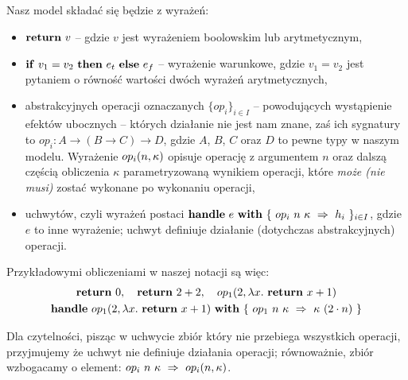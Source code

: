 Nasz model składać się będzie z wyrażeń:
\begin{itemize}
\item \(\mathbf{return}\ v\) -- gdzie \(v\) jest wyrażeniem boolowskim lub arytmetycznym,
\item \(\mathbf{if}\ v_1 = v_2\ \mathbf{then}\ e_t\ \mathbf{else}\ e_f\) -- wyrażenie warunkowe, gdzie \(v_1 = v_2\) jest pytaniem o równość wartości dwóch wyrażeń arytmetycznych,
\item abstrakcyjnych operacji oznaczanych \(\{op_i\}_{i \in I}\) -- powodujących wystąpienie efektów ubocznych -- których działanie nie jest nam znane, zaś ich sygnatury to \(op_i: A \rightarrow (B \rightarrow C) \rightarrow D\), gdzie \(A\), \(B\), \(C\) oraz \(D\) to pewne typy w naszym modelu. Wyrażenie \(op_{i}(n, \kappa)\) opisuje operację z argumentem \(n\) oraz dalszą częścią obliczenia \(\kappa\) parametryzowaną wynikiem operacji, które \textit{może (nie musi)} zostać wykonane po wykonaniu operacji,
\item uchwytów, czyli wyrażeń postaci \(\mathbf{handle}\ e\ \mathbf{with}\ \{\ op_i\ n\ \kappa\ \Rightarrow\ h_i\ \}_{i \in I}\), gdzie \(e\) to inne wyrażenie; uchwyt definiuje działanie (dotychczas abstrakcyjnych) operacji. 
\end{itemize}

Przykładowymi obliczeniami w naszej notacji są więc:
\begin{equation}
\begin{gathered}
  \return{0},\quad\return{2 + 2},\quad \opi{1}{2}{\fun{x}{\return{x + 1}}} \\
  \handle{\opi{1}{2}{\fun{x}{\return{x + 1}}}}{\{\ \hcase{op_1}{n\ \kappa}{\kappa\ (2 \cdot n)} \ \}}
\end{gathered}
\end{equation}

Dla czytelności, pisząc w uchwycie zbiór który nie przebiega wszystkich operacji, przyjmujemy że uchwyt nie definiuje działania operacji; równoważnie, zbiór wzbogacamy o element: \(op_i\ n\ \kappa\ \Rightarrow\ op_i(n, \kappa)\).

